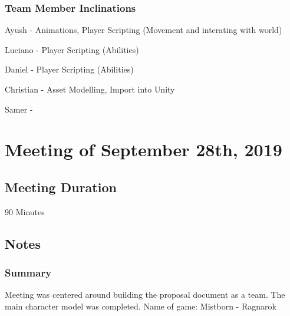 \documentclass{article}
\begin{document}
  \begin{figure}[!htb]
  \end{figure}

\newpage
 \subsubsection{Team Member Inclinations}
 \begin{description}
 \item Ayush - Animations, Player Scripting (Movement and interating with world)
 \item Luciano - Player Scripting (Abilities)
 \item Daniel - Player Scripting (Abilities)
 \item Christian - Asset Modelling, Import into Unity
 \item Samer - 
\end{description}










\section{Meeting of September 28th, 2019}

\subsection{Meeting Duration}
90 Minutes

\subsection{Notes}

\subsubsection{Summary}
Meeting was centered around building the proposal document as a team. The main character model was completed. Name of game: Mistborn - Ragnarok
\end{document}
